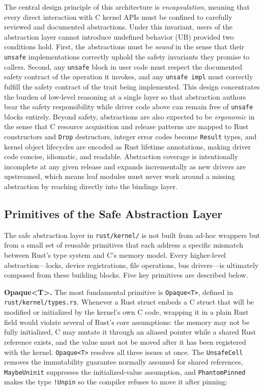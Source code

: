

The central design principle of this architecture is \emph{encapsulation},
meaning that every direct interaction with C kernel APIs must be confined to
carefully reviewed and documented abstractions.
Under this invariant, users of the abstraction layer cannot introduce
undefined behavior (UB) provided two conditions hold.
First, the abstractions must be \emph{sound} in the sense that their
\texttt{unsafe} implementations correctly uphold the safety invariants they
promise to callers.
Second, any \texttt{unsafe} block in user code must respect the documented
safety contract of the operation it invokes, and any \texttt{unsafe impl}
must correctly fulfill the safety contract of the trait being implemented.
This design concentrates the burden of low-level reasoning at a single layer
so that abstraction authors bear the safety responsibility while driver code
above can remain free of \texttt{unsafe} blocks entirely.
Beyond safety, abstractions are also expected to be \emph{ergonomic} in the
sense that C resource acquisition and release patterns are mapped to Rust
constructors and \texttt{Drop} destructors, integer error codes become
\texttt{Result} types, and kernel object lifecycles are encoded as Rust
lifetime annotations, making driver code concise, idiomatic, and readable.
Abstraction coverage is intentionally incomplete at any given release and
expands incrementally as new drivers are upstreamed, which means leaf modules
must never work around a missing abstraction by reaching directly into the
bindings layer.

\subsection{Primitives of the Safe Abstraction Layer}

The safe abstraction layer in \texttt{rust/kernel/} is not built from ad-hoc wrappers but from a
small set of reusable primitives that each address a specific mismatch between Rust's type system
and C's memory model.
Every higher-level abstraction---locks, device registrations, file operations, bus drivers---is
ultimately composed from these building blocks.
Five key primitives are described below.

\textbf{Opaque\textless T\textgreater.}
The most fundamental primitive is \texttt{Opaque<T>}, defined in \texttt{rust/kernel/types.rs}.
Whenever a Rust struct embeds a C struct that will be modified or initialized by the kernel's own
C code, wrapping it in a plain Rust field would violate several of Rust's core assumptions: the
memory may not be fully initialized, C may mutate it through an aliased pointer while a shared
Rust reference exists, and the value must not be moved after it has been registered with the
kernel.
\texttt{Opaque<T>} resolves all three issues at once.
The \texttt{UnsafeCell} removes the immutability guarantee normally assumed for shared references,
\texttt{MaybeUninit} suppresses the initialized-value assumption, and \texttt{PhantomPinned} makes
the type \texttt{!Unpin} so the compiler refuses to move it after pinning:

